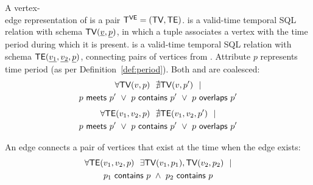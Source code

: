 \begin{definition}
A vertex-\\edge representation of \tg is a pair $\mathsf{T^{VE}}=(\textsf{TV}, \textsf{TE})$. \tv
is a valid-time temporal SQL relation with schema $\textsf{TV}(\underline{v},
\underline{p})$, in which a tuple associates a vertex with the time
period during which it is present. \te is a valid-time temporal SQL
relation with schema $\textsf{TE}(\underline{v_1}, \underline{v_2},
\underline{p})$, connecting pairs of vertices from \tv.  Attribute $p$
represents time period (as per Definition~\ref{def:period}).  Both \tv
and \te are coalesced:
\begin{multline}
\forall \textsf{TV}(v, p)~~\nexists \textsf{TV}(v, p')~~| \\
                       p~\mathsf{meets}~p'~\lor~p~\mathsf{contains}~p'~\lor~p~\mathsf{overlaps}~p'
\label{def:tg:c2}
\end{multline}
\vspace{-0.5cm}
\begin{multline}
\forall \textsf{TE}(v_1, v_2, p)~~\nexists \textsf{TE}(v_1,v_2, p')~~| \\
                       p~\mathsf{meets}~p'~\lor~p~\mathsf{contains}~p'~\lor~p~\mathsf{overlaps}~p'
\label{def:tg:c3}
\end{multline}

An edge connects a pair of vertices that exist at the time when the edge exists:
\begin{multline}
\forall \textsf{TE}(v_1, v_2, p)~~\exists \textsf{TV}(v_1, p_1), \textsf{TV}(v_2, p_2)~~| \\
                       p_1~\mathsf{contains}~p~\wedge~p_2~\mathsf{contains}~p
\label{def:tg:c1}
\end{multline}
\vspace{-0.5cm}


\end{definition}
